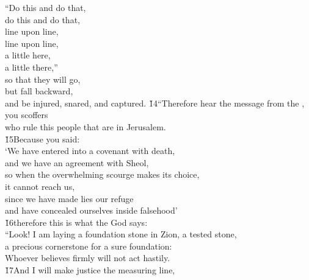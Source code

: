 \begin{poetry}
\poemll    ``Do this and do that, \\
\poemlll       do this and do that, \\
\poemll    line upon line, \\
\poemlll       line upon line, \\
\poemll    a little here, \\
\poemlll       a little there,'' \\
\poeml so that they will go, \\
\poemll    but fall backward, \\
\poemlll       and be injured, snared, and captured.
\poeml \v{14}``Therefore hear the message from the , you scoffers \\
\poemll    who rule this people that are in Jerusalem. \\
\poeml \v{15}Because you said: \\
\poemll    `We have entered into a covenant with death, \\
\poemlll       and we have an agreement with Sheol, \\
\poemll    so when the overwhelming scourge makes its choice, \\
\poemlll       it cannot reach us, \\
\poemll    since we have made lies our refuge \\
\poemlll       and have concealed ourselves inside falsehood' \\
\poeml \v{16}therefore this is what the  God says: \\
\poemll    ``Look! I am laying a foundation stone in Zion, a tested stone, \\
\poemlll       a precious cornerstone for a sure foundation: \\
\poemll    Whoever believes firmly will not act hastily. \\
\poeml \v{17}And I will make justice the measuring line, \\

\end{poetry}
